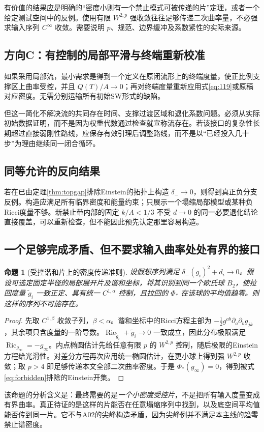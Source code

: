 \documentclass[UTF8,a4paper,11pt,fontset=fandol]{ctexart}
\numberwithin{equation}{section}
\newtheorem{proposition}[theorem]{命题}
\theoremstyle{definition}
\newcommand{\Ric}{\operatorname{Ric}}
\begin{document}
有价值的结果应是明确的“密度小则有一个禁止模式可被传递的片”定理，或者一个给定测试空间中的反例。使用有限 $W^{2,p}$ 强收敛往往足够传递二次曲率量，不必强求输入序列 $C^\infty$ 收敛。需要说明 $p$、规范、边界缓冲及系数紧性的实际来源。

\subsection{方向C：有控制的局部平滑与终端重新校准}
如果采用局部流，最小需求是得到一个定义在原闭流形上的终端度量，使正比例支撑区上曲率受控，并且 $Q(T)/A\to0$；再对终端度量重新应用式\eqref{eq:119}或原稿对应密度。无需分别运输所有初始SW形式的缺陷。

但这一简化不解决流的共同存在时间、支撑过渡区域和退化系数问题。必须从实际初始数据证明，而不是因为权重代数通过检查就宣称流存在。若该接口的复杂性长期超过直接弱刚性路线，应保存有效引理后调整路线，而不是以“已经投入几十步”为理由继续同一闭合循环。

\subsection{同等允许的反向结果}
若在已由定理\ref{thm:topgap}排除Einstein的拓扑上构造 $\delta_-\to0$，则得到真正负分支反例。构造应满足所有临界密度和能量约束；只展示一个塌缩局部模型或某种负Ricci度量不够。新禁止带内部的固定 $k/A<1/3$ 不受 $d\to0$ 的同一必要退化结论直接覆盖，可以重新检查，但不能因此预先认定那里容易构造。


\subsection{一个足够完成矛盾、但不要求输入曲率处处有界的接口}
\begin{proposition}[受控谐和片上的密度传递准则]\label{prop:minimalbridge}
设假想序列满足 $\delta_-(g_i)^2+d_i\to0$。假设可选定固定半径的局部展开片及谐和坐标，将其识别到同一个欧氏球 $B_2$，使拉回度量 $\widetilde g_i$ 一致正定、具有统一 $C^{1,\alpha}$ 控制，且拉回的 $\Phi_*$ 在该球的平均值趋零。则这样的序列不可能存在。
\end{proposition}
\begin{proof}
先取 $C^{1,\beta}$ 收敛子列，$\beta<\alpha$。谐和坐标中的Ricci方程主部为 $-\frac12 g^{ab}\partial_a\partial_b g_{jk}$，其余项只含度量的一阶导数。$\Ric_{\widetilde g_i}+\widetilde g_i\to0$ 一致成立，因此分布极限满足 $\Ric_{g_\infty}=-g_\infty$。内点椭圆估计先给任意有限 $p$ 的 $W^{2,p}$ 控制，随后极限的Einstein方程给光滑性。对差分方程再次应用统一椭圆估计，在更小球上得到强 $W^{2,p}$ 收敛；取 $p>4$ 即足够传递本文全部二次曲率密度。于是 $\Phi_*(g_\infty)=0$，得到被式\eqref{eq:forbidden}排除的Einstein开集。
\end{proof}
该命题的分析含义是：最终需要的是\emph{一个小密度受控片}，不是把所有输入度量变成有界曲率。真正待证的是这样的片能否在任意塌缩序列中找到，以及底空间平均值能否传到同一片。它不与A02的尖峰构造矛盾，因为尖峰例并不满足本主线的趋零禁止谱密度。
\end{document}
